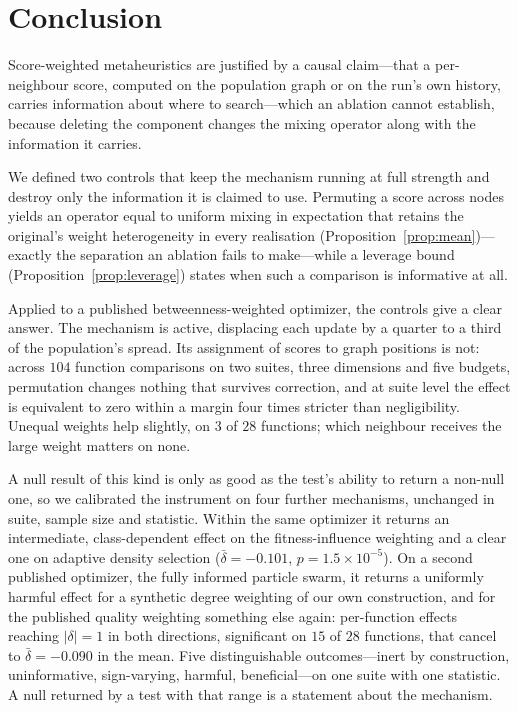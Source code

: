 \section{Conclusion}
\label{sec:conclusion}

Score-weighted metaheuristics are justified by a causal claim---that a
per-neighbour score, computed on the population graph or on the run's own
history, carries information about where to search---which an ablation cannot
establish, because deleting the component changes the mixing operator along
with the information it carries.

We defined two controls that keep the mechanism running at full strength and
destroy only the information it is claimed to use. Permuting a score across
nodes yields an operator equal to uniform mixing in expectation that retains
the original's weight heterogeneity in every realisation
(Proposition~\ref{prop:mean})---exactly the separation an ablation fails to
make---while a leverage bound (Proposition~\ref{prop:leverage}) states when
such a comparison is informative at all.

Applied to a published betweenness-weighted optimizer, the controls give a
clear answer. The mechanism is active, displacing each update by a quarter to a
third of the population's spread. Its assignment of scores to graph positions
is not: across $104$ function comparisons on two suites, three dimensions and
five budgets, permutation changes nothing that survives correction, and at
suite level the effect is equivalent to zero within a margin four times
stricter than negligibility. Unequal weights help slightly, on $3$ of $28$
functions; which neighbour receives the large weight matters on none.

A null result of this kind is only as good as the test's ability to return a
non-null one, so we calibrated the instrument on four further mechanisms,
unchanged in suite, sample size and statistic. Within the same optimizer it
returns an intermediate, class-dependent effect on the fitness-influence
weighting and a clear one on adaptive density selection ($\bar{\delta}=-0.101$,
$p=1.5\times10^{-5}$). On a second published optimizer, the fully informed
particle swarm, it returns a uniformly harmful effect for a synthetic
degree weighting of our own construction, and for the published quality
weighting something else again: per-function effects reaching $|\delta|=1$ in
both directions, significant on $15$ of $28$ functions, that cancel to
$\bar{\delta}=-0.090$ in the mean. Five distinguishable outcomes---inert by
construction, uninformative, sign-varying, harmful, beneficial---on one suite
with one statistic. A null returned by a test with that range is a statement
about the mechanism.

